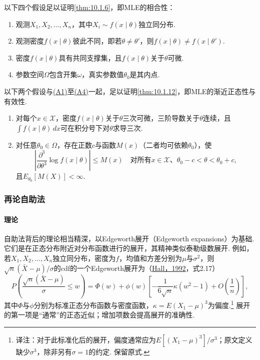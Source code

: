 以下四个假设足以证明\autoref{thm:10.1.6}，即MLE的相合性：
\begin{enumerate}[label=(A\arabic*)]
\item\label{item:10.6.A1} 观测$X_1,X_2,\ldots,X_n$，其中$X_i\sim f(x\mid\theta)$独立同分布.
\item\label{item:10.6.A2} 观测密度$f(x\mid\theta)$彼此不同，即若$\theta\ne\theta'$，则$f(x\mid\theta)\ne f(x\mid\theta')$.
\item\label{item:10.6.A3} 密度$f(x\mid\theta)$具有共同支撑集，且$f(x\mid\theta)$关于$\theta$可微.
\item\label{item:10.6.A4} 参数空间$\Omega$包含开集$\omega$，真实参数值$\theta_0$是其内点.
\end{enumerate}
以下两个假设与\hyperref[item:10.6.A1]{(A1)}至\hyperref[item:10.6.A4]{(A4)}一起，足以证明\autoref{thm:10.1.12}，即MLE的渐近正态性与有效性.
\begin{enumerate}[label=(A\arabic*),start=5]
\item\label{item:10.6.A5} 对每个$x\in\mathcal X$，密度$f(x\mid\theta)$关于$\theta$三次可微，三阶导数关于$\theta$连续，且$\int f(x\mid\theta)\,dx$可在积分号下对$\theta$求导三次.
\item\label{item:10.6.A6} 对任意$\theta_0\in\Omega$，存在正数$c$与函数$M(x)$（二者均可依赖$\theta_0$），使
$$\left|\frac{\partial^3}{\partial\theta^3}\log f(x\mid\theta)\right|\leq M(x)\quad\text{对所有$x\in\mathcal X$、$\theta_0-c<\theta<\theta_0+c$},$$
且$E_{\theta_0}[M(X)]<\infty$.
\end{enumerate}

\subsubsection{再论自助法}\label{sec:10.6.3}
\paragraph{理论}
自助法背后的理论相当精深，以Edgeworth展开（Edgeworth expansions）为基础. 它们是在正态分布附近对分布函数进行的展开，其精神类似泰勒级数展开. 例如，若$X_1,X_2,\ldots,X_n$独立同分布，密度为$f$，均值和方差分别为$\mu$与$\sigma^2$，则$\sqrt n(\bar X-\mu)/\sigma$的cdf的一个Edgeworth展开为（\hyperref[bib:source154]{Hall，1992}，式2.17）
$$P\left(\frac{\sqrt n(\bar X-\mu)}\sigma\leq w\right)=\Phi(w)+\phi(w)\left[-\frac1{6\sqrt n}\kappa(w^2-1)+O\left(\frac1n\right)\right],$$
其中$\Phi$与$\phi$分别为标准正态分布函数与密度函数，$\kappa=E(X_1-\mu)^3$为偏度.\footnote{译注：对于此标准化后的展开，偏度通常应为$E[(X_1-\mu)^3]/\sigma^3$；原文定义缺少$\sigma^3$，除非另有$\sigma=1$的约定. 保留原式.} 展开的第一项是“通常”的正态近似；增加项数会提高展开的准确性.

